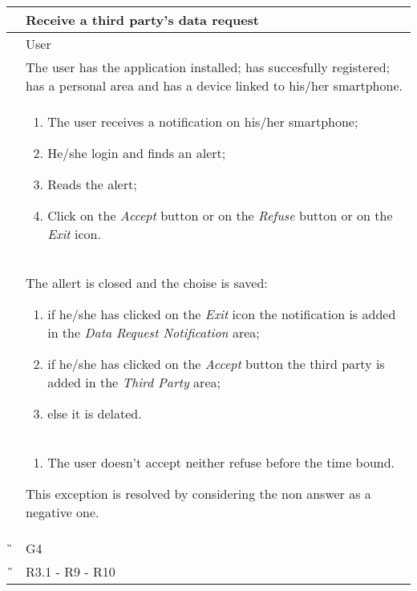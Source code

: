 \begin{center}
	\begin{longtable}{ | p{} | p{} | }
		\hline
		 \A &   Receive a third party's data request\\ 

		\hline
		 \B &  User \\ 

		\hline
  		 \C &  The user has the application installed; has succesfully registered; has a personal area and has a device linked to his/her smartphone.\\ 

		\hline
		\D & \begin{enumerate}
			\item The user receives a notification on his/her smartphone;
			\item He/she login and finds an alert;
			\item Reads the alert;
			\item Click on the \textit{Accept} button or on the \textit{Refuse} button or on the \textit{Exit} icon.
		\end{enumerate} \\

		\hline
		\E & The allert is closed and the choise is saved: \begin{enumerate}
			\item if he/she has clicked on the \textit{Exit} icon the notification is added in the \textit{Data Request Notification} 				area;
			\item if he/she has clicked on the \textit{Accept} button the third party is added in the \textit{Third Party} area;					\item else it is delated.
		\end{enumerate}\\

		\hline
		\F & \begin{enumerate}
			\item The user doesn't accept neither refuse before the time bound.
		\end{enumerate} This exception is resolved by considering the non answer as a negative one. \\
		
		\hline
		\G & G4\\

		\hline
		\H & R3.1 - R9 - R10 \\
		\hline

	\end{longtable}
\end{center}